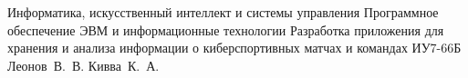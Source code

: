 \documentclass{bmstu}
\begin{document}
\makecourseworktitle
    {Информатика, искусственный интеллект и системы управления} %
    {Программное обеспечение ЭВМ и информационные технологии} %
    {Разработка приложения для хранения и анализа информации о киберспортивных матчах и командах} %
    {ИУ7-66Б} %
    {Леонов~В.~В.} %
    {Кивва~К.~А.} %
    {}
    {}
    
\setcounter{page}{3}


\maketableofcontents








\makebibliography


\end{document}
